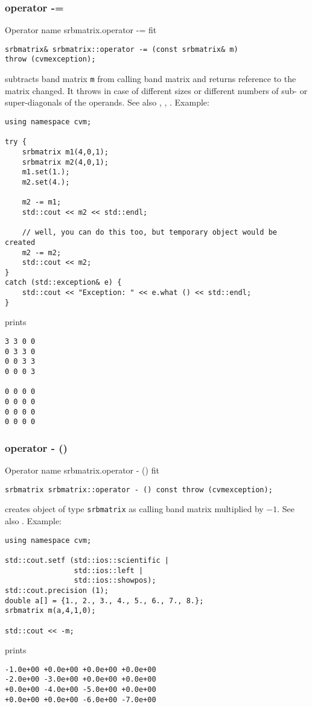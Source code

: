 \subsubsection{operator -=}
Operator%
\pdfdest name {srbmatrix.operator -=} fit
\begin{verbatim}
srbmatrix& srbmatrix::operator -= (const srbmatrix& m) 
throw (cvmexception);
\end{verbatim}
subtracts  band matrix \verb"m" from  calling band matrix
and returns  reference to
the matrix changed.
It throws  
in case of different sizes or different numbers of sub- or super-diagonals
of the operands.
See also ,
,
.
Example:
\begin{Verbatim}
using namespace cvm;

try {
    srbmatrix m1(4,0,1);
    srbmatrix m2(4,0,1);
    m1.set(1.);
    m2.set(4.);

    m2 -= m1;
    std::cout << m2 << std::endl;

    // well, you can do this too, but temporary object would be created
    m2 -= m2; 
    std::cout << m2;
}
catch (std::exception& e) {
    std::cout << "Exception: " << e.what () << std::endl;
}
\end{Verbatim}
prints
\begin{Verbatim}
3 3 0 0
0 3 3 0
0 0 3 3
0 0 0 3

0 0 0 0
0 0 0 0
0 0 0 0
0 0 0 0
\end{Verbatim}
\newpage





\subsubsection{operator - ()}
Operator%
\pdfdest name {srbmatrix.operator - ()} fit
\begin{verbatim}
srbmatrix srbmatrix::operator - () const throw (cvmexception);
\end{verbatim}
creates  object of type \verb"srbmatrix" as
 calling band matrix multiplied by $-1$.
See also .
Example:
\begin{Verbatim}
using namespace cvm;

std::cout.setf (std::ios::scientific | 
                std::ios::left | 
                std::ios::showpos); 
std::cout.precision (1);
double a[] = {1., 2., 3., 4., 5., 6., 7., 8.};
srbmatrix m(a,4,1,0);

std::cout << -m;
\end{Verbatim}
prints
\begin{Verbatim}
-1.0e+00 +0.0e+00 +0.0e+00 +0.0e+00
-2.0e+00 -3.0e+00 +0.0e+00 +0.0e+00
+0.0e+00 -4.0e+00 -5.0e+00 +0.0e+00
+0.0e+00 +0.0e+00 -6.0e+00 -7.0e+00
\end{Verbatim}
\newpage




